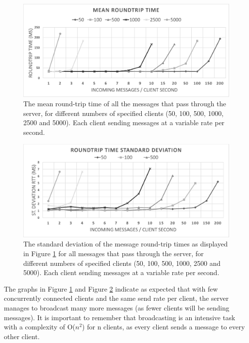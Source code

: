 \documentclass[bsc, 12pt, twoside, singlespacing, parskip, abbrevs, notimes, normalheadings, logo]{styles/infthesis}
\begin{document}
\begin{figure}[H]
\centering
\includegraphics[scale=0.58]{images/test_SERVER_RTTmean.eps}
\caption{The mean round-trip time of all the messages that pass through the server, for different numbers of specified clients (50, 100, 500, 1000, 2500 and 5000). Each client sending messages at a variable rate per second.}
\label{fig:broadcast_rtt_mean}
\end{figure}

\begin{figure}[H]
\centering
\includegraphics[scale=0.58]{images/test_SERVER_RTTstd.eps}
\caption{The standard deviation of the message round-trip times as displayed in Figure \ref{fig:broadcast_rtt_mean} for all messages that pass through the server, for different numbers of specified clients (50, 100, 500, 1000, 2500 and 5000). Each client sending messages at a variable rate per second.}
\label{fig:broadcast_rtt_std}
\end{figure}

The graphs in Figure \ref{fig:broadcast_rtt_mean} and Figure \ref{fig:broadcast_rtt_std} indicate as expected that with few concurrently connected clients and the same send rate per client, the server manages to broadcast many more messages (as fewer clients will be sending messages). It is important to remember that broadcasting is an intensive task with a complexity of O($n^{2}$) for n clients, as every client sends a message to every other client.
\end{document}
